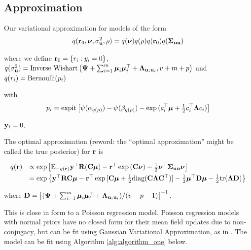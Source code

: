 \documentclass{article}[12pt]
\newcommand{\joc}[1]{{\color{red}#1}}
\begin{document}


\subsection{Approximation}

Our variational approximation for models of the form 
$$
q({\bf r}_0, {\boldsymbol \nu}, \sigma_{{\bf u}}^2, \rho) = q({\boldsymbol \nu})q(\rho) q({\bf r}_0)q({\boldsymbol \Sigma}_{{\bf u} {\bf u}})  \\
$$

\noindent 
where we define ${\bf r}_0 = \{ r_i : y_i = 0 \}$,
$q(\sigma_{{\bf u}}^2) = \mbox{Inverse Wishart}\left({\boldsymbol \Psi} + \sum_{i=1}^m {\boldsymbol \mu}_i {\boldsymbol \mu}_i^\top + {\boldsymbol \Lambda}_{{\bf u}_i {\bf u}_i}, v + m + 
p\right)$ \mbox{and } $q(r_i) = \text{Bernoulli} (p_i)$

\noindent 
with
$$
p_i = \text{expit} \left[ \psi{(\alpha_{q(\rho)})} - \psi{(\beta_{q(\rho)})} - \exp{(c_i^\top{\boldsymbol\mu}+  \tfrac{1}{2} c_i^\top {\boldsymbol\Lambda}c_i)} \right]
$$

\noindent 
{} ${\bf y}_i = 0$.


The optimal approximation \joc{(reword: the ``optimal approximation'' might be called the true posterior)} for ${\bf r}$ is


$$
\begin{array}{rl}
	q({\bf r}) & \propto \exp \left [ {\mathbb E}_{-q({\bf r})}{\bf y}^\top{\bf R}({\bf C}{\boldsymbol \mu}) - {\bf r}^\top\exp{({\bf C}{\boldsymbol\nu})}-\tfrac{1}{2} {\boldsymbol \nu}^\top {\boldsymbol\Sigma}_{{\bf u} {\bf u}} {\boldsymbol \nu} \right ]                                                  \\ [1ex]
	       & = \exp{ \left\{ {\bf y}^\top{\bf R}{\bf C}{\boldsymbol\mu}- {\bf r}^\top \exp{[{\bf C}{\boldsymbol\mu}+  \tfrac{1}{2} \text{diag}({\bf C}{\boldsymbol\Lambda}{\bf C}^\top)]} -  \tfrac{1}{2} {\boldsymbol\mu}^\top {\bf D}{\boldsymbol\mu}-  \tfrac{1}{2} \text{tr}({\boldsymbol\Lambda}{\bf D}) \right\} } 
\end{array}
$$

where ${\bf D} = \left[ ({\boldsymbol \Psi} + \sum_{i=1}^m {\boldsymbol \mu}_i {\boldsymbol \mu}_i^\top + {\boldsymbol \Lambda}_{{\bf u}_i{\bf u}_i}) / (v - p - 1) \right]^{-1}$. 

This is close in form to a Poisson regression model. Poisson regression models with normal priors have no
closed form for their mean field updates due to non- conjugacy, but can be fit using Gaussian Variational
Approximation, as in \cite{ormerod09}. The model can be fit using Algorithm \ref{alg:algorithm_one} below.
\end{document}
